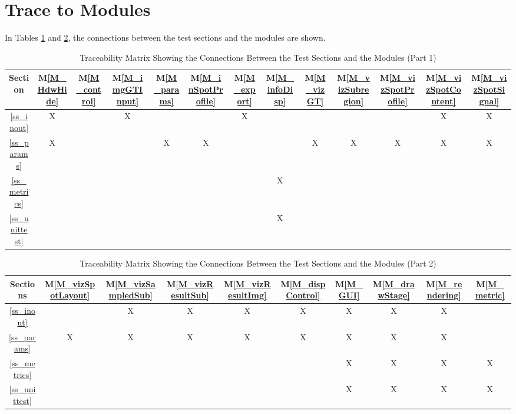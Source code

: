 \documentclass[12pt, titlepage]{article}
\newcommand{\mref}[1]{M\ref{#1}}
\begin{document}
\section{Trace to Modules}
In Tables \ref{Table:M_trace} and \ref{Table:M_trace2},
the connections between the test sections and the modules are shown.

\begin{table}[h]
  \centering
  \begin{tabular}{|c|c|c|c|c|c|c|c|c|c|c|c|c|}
      \hline
      Section &
      \mref{M_HdwHide} &
      \mref{M_control} &
      \mref{M_imgGTInput} &
      \mref{M_params} &
      \mref{M_inSpotProfile} &
      \mref{M_export} &
      \mref{M_infoDisp} &
      \mref{M_vizGT} &
      \mref{M_vizSubregion} &
      \mref{M_vizSpotProfile} &
      \mref{M_vizSpotContent} &
      \mref{M_vizSpotSignal}
      \\
      \hline
       \ref{ss_inout}     &X& &X& & &X& & & & &X&X\\ \hline
       \ref{ss_params}    &X& & &X&X& & &X&X&X&X&X\\ \hline
       \ref{ss_metrics}   & & & & & & &X& & & & & \\ \hline
       \ref{ss_unittest}  & & & & & & &X& & & & & \\ \hline
  \end{tabular}
  \caption{Traceability Matrix Showing the Connections Between the Test Sections
    and the Modules (Part 1)}
  \label{Table:M_trace}
\end{table}

\begin{table}[h]
  \centering
  \begin{tabular}{|c|c|c|c|c|c|c|c|c|c|}
      \hline
      Sections &
      \mref{M_vizSpotLayout} &
      \mref{M_vizSampledSub} &
      \mref{M_vizResultSub} &
      \mref{M_vizResultImg} &
      \mref{M_dispControl} &
      \mref{M_GUI} &
      \mref{M_drawStage} &
      \mref{M_rendering} &
      \mref{M_metric}
      \\
      \hline
       \ref{ss_inout}     & &X&X&X&X&X&X&X& \\ \hline
       \ref{ss_params}    &X&X&X&X&X&X&X&X& \\ \hline
       \ref{ss_metrics}   & & & & & &X&X&X&X\\ \hline
       \ref{ss_unittest}  & & & & & &X&X&X&X\\ \hline
  \end{tabular}
  \caption{Traceability Matrix Showing the Connections Between the Test Sections
    and the Modules (Part 2)}
  \label{Table:M_trace2}
\end{table}
\end{document}
